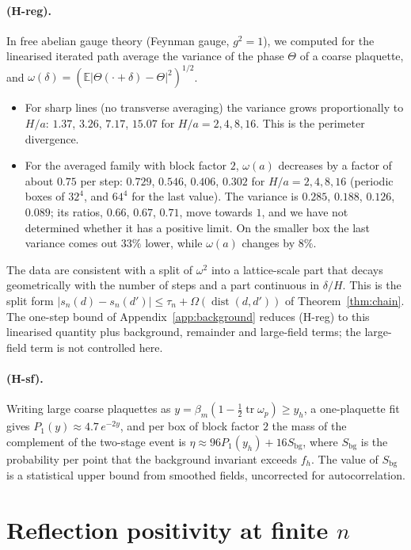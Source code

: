 \documentclass[11pt,a4paper]{article}
\theoremstyle{definition}
\theoremstyle{remark}
\newcommand{\E}{\mathbb{E}}
\begin{document}
\paragraph{(H-reg).} In free abelian gauge theory (Feynman gauge, $g^2=1$), we computed for the linearised iterated path average the variance of the phase $\Theta$ of a coarse plaquette, and $\omega(\delta)=(\E|\Theta(\cdot+\delta)-\Theta|^2)^{1/2}$.
\begin{itemize}[leftmargin=2em]
\item For sharp lines (no transverse averaging) the variance grows proportionally to $H/a$: $1.37$, $3.26$, $7.17$, $15.07$ for $H/a=2,4,8,16$. This is the perimeter divergence.
\item For the averaged family with block factor $2$, $\omega(a)$ decreases by a factor of about $0.75$ per step: $0.729$, $0.546$, $0.406$, $0.302$ for $H/a=2,4,8,16$ (periodic boxes of $32^4$, and $64^4$ for the last value). The variance is $0.285$, $0.188$, $0.126$, $0.089$; its ratios, $0.66$, $0.67$, $0.71$, move towards $1$, and we have not determined whether it has a positive limit. On the smaller box the last variance comes out $33\%$ lower, while $\omega(a)$ changes by $8\%$.
\end{itemize}
The data are consistent with a split of $\omega^2$ into a lattice-scale part that decays geometrically with the number of steps and a part continuous in $\delta/H$. This is the split form $|s_n(d)-s_n(d')|\le\tau_n+\Omega(\operatorname{dist}(d,d'))$ of Theorem~\ref{thm:chain}. The one-step bound of Appendix~\ref{app:background} reduces (H-reg) to this linearised quantity plus background, remainder and large-field terms; the large-field term is not controlled here.

\paragraph{(H-sf).} Writing large coarse plaquettes as $y=\beta_m(1-\tfrac12\operatorname{tr}\omega_p)\ge y_h$, a one-plaquette fit gives $P_1(y)\approx4.7\,e^{-2y}$, and per box of block factor $2$ the mass of the complement of the two-stage event is $\eta\approx96P_1(y_h)+16S_{\mathrm{bg}}$, where $S_{\mathrm{bg}}$ is the probability per point that the background invariant exceeds $f_h$. The value of $S_{\mathrm{bg}}$ is a statistical upper bound from smoothed fields, uncorrected for autocorrelation.

\section{Reflection positivity at finite \texorpdfstring{$n$}{n}}\label{app:rp}
\end{document}
